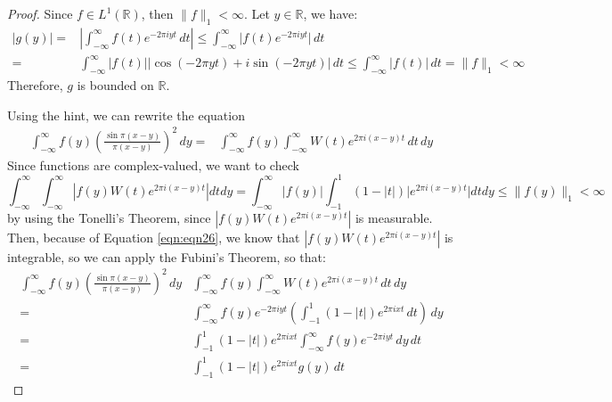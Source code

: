 \begin{answer}
    \begin{proof}
        Since $f \in L^1(\mathbb{R})$, then $\lVert f \rVert_1 < \infty$. Let $y \in \mathbb{R}$, we have:
        \begin{equation}
            \begin{aligned}
                \lvert g(y) \rvert = &\left\lvert \int_{-\infty}^{\infty} f(t) e^{-2\pi iyt} \,dt \right\rvert \leq \int_{-\infty}^{\infty} \lvert f(t)e^{-2 \pi iyt} \rvert \,dt\\
                = &\int_{-\infty}^{\infty} \lvert f(t) \rvert \lvert \cos(-2\pi yt) + i\sin(-2\pi yt) \rvert \,dt \leq \int_{-\infty}^{\infty} \lvert f(t) \rvert \,dt = \lVert f \rVert_1 < \infty
            \end{aligned}
        \end{equation}
        Therefore, $g$ is bounded on $\mathbb{R}$.
        
        Using the hint, we can rewrite the equation
        \begin{equation}
            \begin{aligned}
                \int_{-\infty}^{\infty} f(y)\left(\frac{\sin \pi(x-y)}{\pi(x-y)}\right)^2 \,d y = &\int_{-\infty}^{\infty}f(y)\int_{-\infty}^{\infty}W(t)e^{2\pi i (x-y)t}\,dt\,dy
            \end{aligned}
        \end{equation}
        Since functions are complex-valued, we want to check
        \begin{equation}\label{eqn:eqn26}
            \int_{-\infty}^{\infty} \int_{-\infty}^{\infty}\left|f(y) W(t) e^{2 \pi i(x-y) t}\right| d t d y=\int_{-\infty}^{\infty}|f(y)| \int_{-1}^1(1-|t|) \lvert e^{2\pi i (x-y)t} \rvert d t d y \leq \lVert f(y) \rVert_1 < \infty
        \end{equation}
        by using the Tonelli's Theorem, since $|f(y) W(t) e^{2 \pi i(x-y) t}|$ is measurable. Then, because of Equation \ref{eqn:eqn26}, we know that $|f(y) W(t) e^{2 \pi i(x-y) t}|$ is integrable, so we can apply the Fubini's Theorem, so that:
        \begin{equation}
            \begin{aligned}
                \int_{-\infty}^{\infty} f(y)\left(\frac{\sin \pi(x-y)}{\pi(x-y)}\right)^2 \,d y &\int_{-\infty}^{\infty}f(y)\int_{-\infty}^{\infty}W(t)e^{2\pi i (x-y)t}\,dt\,dy\\
                = &\int_{-\infty}^{\infty}f(y) e^{-2\pi iyt}\left(\int_{-1}^{1} (1-\lvert t \rvert) e^{2\pi ixt} \,dt\right)\,dy\\
                = &\int_{-1}^{1} (1-\lvert t \rvert)e^{2\pi ixt}\int_{-\infty}^{\infty}f(y)e^{-2\pi iyt}\,dy\,dt\\
                = &\int_{-1}^{1}(1-\lvert t \rvert)e^{2\pi ixt}g(y) \,dt
            \end{aligned}
        \end{equation}
    \end{proof}
\end{answer}